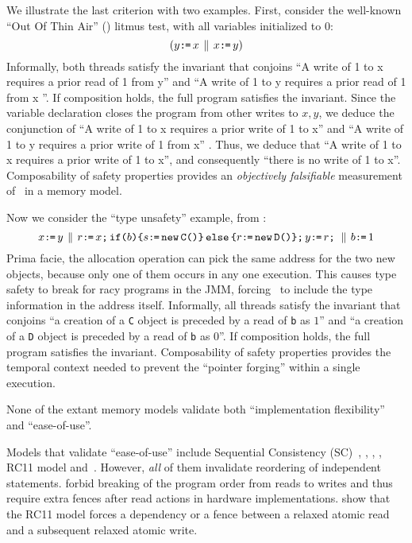 We illustrate the last criterion with two examples.   
First, consider the well-known ``Out Of Thin Air'' (\oota) litmus test, with all variables initialized to $0$:
\begin{equation}
  \label{oota1}
  (y\texttt{:}\mkern-1mu\texttt{=}\, x \,\mathbin{\|}\, x \texttt{:}\mkern-1mu\texttt{=}\, y)
\end{equation}
Informally, both threads satisfy the invariant that conjoins ``A write of 1  to x  requires a prior read  of 1 from y'' and ``A write of 1  to y  requires a prior read  of 1 from x ''.  If composition holds, the full program satisfies the invariant.  Since the variable declaration closes the program from other writes to $x,y$, we  deduce the conjunction of  ``A write of 1  to x  requires a prior write  of 1 to x'' and ``A write of 1  to y  requires a prior write  of 1 from x'' . Thus, we deduce that ``A write of 1  to x  requires a prior write  of 1 to x'', and consequently ``there is no write of 1 to x''. 
Composability  of safety properties provides an  {\em objectively  falsifiable} measurement of \oota\ in a memory model. 


Now we consider the ``type unsafety'' example, from
\citep[Figure 8]{DBLP:journals/toplas/Lochbihler13}:
\begin{equation}
  \label{types}
  x\texttt{:}\mkern-1mu\texttt{=}\, y
  \,\mathbin{\|}\,
  r\texttt{:}\mkern-1mu\texttt{=}\, x \texttt{;}\, \texttt{if}\allowbreak\texttt{(}b\texttt{)} \allowbreak\texttt{\{} s \texttt{:}\mkern-1mu\texttt{=}\, \texttt{new}\, \texttt{C()} \texttt{\}}\,\allowbreak\texttt{else}\allowbreak\,\texttt{\{} r \texttt{:}\mkern-1mu\texttt{=}\, \texttt{new}\, \texttt{D()} \texttt{\}}  \texttt{;}\, y \texttt{:}\mkern-1mu\texttt{=}\, r \texttt{;}\,  
  \,\mathbin{\|}\,
  b \texttt{:}\mkern-1mu\texttt{=}\, 1   
\end{equation}
Prima facie, the allocation operation can pick the same address for the two new objects, because only one of them occurs in any one execution.   This causes type safety to break for racy programs in the JMM, forcing~\citeauthor{DBLP:journals/toplas/Lochbihler13} to include the type information in the address itself.
%
Informally, all threads satisfy the invariant that conjoins ``a creation of a \texttt{C} object is preceded by a read of \texttt{b} as $1$'' and ``a creation of a \texttt{D} object is preceded by a read of \texttt{b} as $0$''.  If composition holds, the full program satisfies the invariant.   
%
Composability of safety properties provides the temporal context needed to prevent the ``pointer forging''  within a single execution.  


None of the extant memory models validate both ``implementation flexibility'' and ``ease-of-use''.  

Models that validate ``ease-of-use'' include Sequential Consistency (SC)~\citet{Lamport:1979:MMC:1311099.1311750}, \citet{Dolan:2018:BDR:3192366.3192421}, \citet{DBLP:conf/pldi/LahavVKHD17}, \citet{DBLP:conf/lics/JeffreyR16}, RC11 model\cite{DBLP:conf/pldi/LahavVKHD17} and~\citet{BoehmOOTA}.  However, {\em all} of them invalidate reordering of independent statements.  \cite{Dolan:2018:BDR:3192366.3192421,BoehmOOTA,DBLP:conf/lics/JeffreyR16} forbid breaking of the program order from reads to writes and thus require extra fences after read actions in hardware implementations.  \citet{Boehm:2014:OGA:2618128.2618134} show that the RC11 model\cite{DBLP:conf/pldi/LahavVKHD17} forces a dependency or a fence between a relaxed atomic
read and a subsequent relaxed atomic write.  


